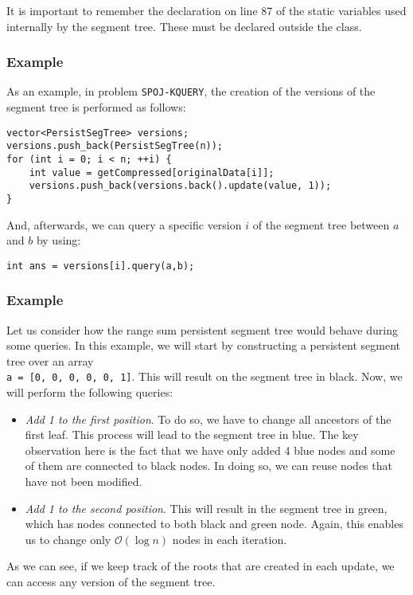 It is important to remember the declaration on line 87 of the static variables
used internally by the segment tree. These must be declared outside the 
class.

\subsubsection{Example}
As an example, in problem \texttt{SPOJ-KQUERY}, the creation of the versions 
of the segment tree is performed as follows:
\begin{verbatim}
vector<PersistSegTree> versions;
versions.push_back(PersistSegTree(n));
for (int i = 0; i < n; ++i) {
	int value = getCompressed[originalData[i]];
	versions.push_back(versions.back().update(value, 1));
}
\end{verbatim}
And, afterwards, we can query a specific version $i$ of the segment tree 
between $a$ and $b$ by using:
\begin{verbatim}
int ans = versions[i].query(a,b);
\end{verbatim}
\newpage
\subsubsection{Example}
Let us consider how the range sum persistent segment tree would behave 
during some queries.
In this example, we will start by constructing a persistent segment
tree over an array \\ \texttt{a = [0, 0, 0, 0, 0, 1]}. This will result on
the segment tree in black.
Now, we will perform the following queries:
\begin{itemize}
		\item \textit{Add 1 to the first position}. To do so, we have to
				change all ancestors of the first leaf. This process will
				lead to the segment tree in blue. The key observation here is
				the fact that we have only added 4 blue nodes and some of them
				are connected to black nodes. In doing so, we can reuse nodes 
				that have not been modified.
		\item \textit{Add 1 to the second position}. This will result in the
				segment tree in green, which has nodes connected to both black 
				and green node. Again, this enables us to change only
				$\mathcal{O}(\log n)$ nodes in each iteration.

\end{itemize}
\begin{figure}[h!]
		\centering
\end{figure}
As we can see, if we keep track of the roots that are created in each update,
we can access any version of the segment tree.
\newpage
